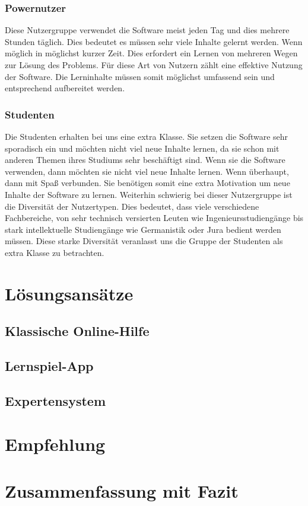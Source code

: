 \subsection{Powernutzer}
Diese Nutzergruppe verwendet die Software meist jeden Tag und dies mehrere Stunden täglich. Dies bedeutet es müssen sehr viele Inhalte gelernt werden. Wenn möglich in möglichst kurzer Zeit. Dies erfordert ein Lernen von mehreren Wegen zur Lösung des Problems. Für diese Art von Nutzern zählt eine effektive Nutzung der Software. Die Lerninhalte müssen somit möglichst umfassend sein und entsprechend aufbereitet werden. 
\subsection{Studenten}
Die Studenten erhalten bei uns eine extra Klasse. Sie setzen die Software sehr sporadisch ein und möchten nicht viel neue Inhalte lernen, da sie schon mit anderen Themen ihres Studiums sehr beschäftigt sind. Wenn sie die Software verwenden, dann möchten sie nicht viel neue Inhalte lernen. Wenn überhaupt, dann mit Spaß verbunden. Sie benötigen somit eine extra Motivation um neue Inhalte der Software zu lernen. Weiterhin schwierig bei dieser Nutzergruppe ist die Diversität der Nutzertypen. Dies bedeutet, dass viele verschiedene Fachbereiche, von sehr technisch versierten Leuten wie Ingenieursstudiengänge bis stark intellektuelle Studiengänge wie Germanistik oder Jura bedient werden müssen. Diese starke Diversität veranlasst uns die Gruppe der Studenten als extra Klasse zu betrachten. 






\chapter{Lösungsansätze}

\section{Klassische Online-Hilfe}

\section{Lernspiel-App}

\section{Expertensystem}
\label{ch:Content2}



\chapter{Empfehlung}

\chapter{Zusammenfassung mit Fazit}


